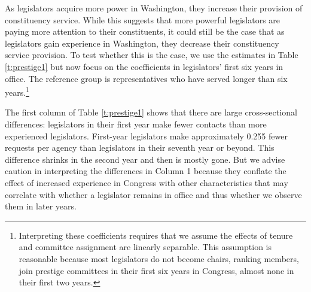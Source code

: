 \documentclass[12pt]{article}
\begin{document}
As legislators acquire more power in Washington, they increase their provision of constituency service. While this suggests that more powerful legislators are paying more attention to their constituents, it could still be the case that as legislators gain experience in Washington, they decrease their constituency service provision. To test whether this is the case, we use the estimates in Table \ref{t:prestige1} but now focus on the coefficients in legislators' first six years in office. The reference group is representatives who have served longer than six years.\footnote{Interpreting these coefficients requires that we assume the effects of tenure and committee assignment are linearly separable. This assumption is reasonable because most legislators do not become chairs, ranking members, join prestige committees in their first six years in Congress, almost none in their first two years.} 


The first column of Table \ref{t:prestige1} shows that there are large cross-sectional differences: legislators in their first year make fewer contacts than more experienced legislators. First-year legislators make approximately 0.255 fewer requests per agency than legislators in their seventh year or beyond. This difference shrinks in the second year and then is mostly gone. But we advise caution in interpreting the differences in Column 1 because they conflate the effect of increased experience in Congress with other characteristics that may correlate with whether a legislator remains in office and thus whether we observe them in later years.   




\end{document}
